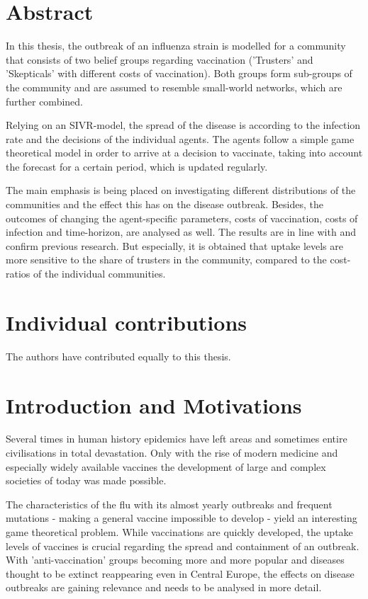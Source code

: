 \documentclass[11pt]{article}
\begin{document}
\section*{Abstract}
In this thesis, the outbreak of an influenza strain is modelled for a community that consists of two belief groups regarding vaccination ('Trusters' and 'Skepticals' with different costs of vaccination). Both groups form sub-groups of the community and are assumed to resemble small-world networks, which are further combined.

Relying on an SIVR-model, the spread of the disease is according to the infection rate and the decisions of the individual agents. The agents follow a simple game theoretical model in order to arrive at a decision to vaccinate, taking into account the forecast for a certain period, which is updated regularly. 

The main emphasis is being placed on investigating different distributions of the communities and the effect this has on the disease outbreak. Besides, the outcomes of changing the agent-specific parameters, costs of vaccination, costs of infection and time-horizon, are analysed as well. 
The results are in line with and confirm previous research. But especially, it is obtained that uptake levels are more sensitive to the share of trusters in the community, compared to the cost-ratios of the individual communities. 

\section*{Individual contributions}
The authors have contributed equally to this thesis. 
\clearpage

\tableofcontents
\clearpage


\section{Introduction and Motivations}
Several times in human history epidemics have left areas and sometimes entire civilisations in total devastation. Only with the rise of modern medicine and especially widely available vaccines the development of large and complex societies of today was made possible.

The characteristics of the flu with its almost yearly outbreaks and frequent mutations - making a general vaccine impossible to develop - yield an interesting game theoretical problem. While vaccinations are quickly developed, the uptake levels of vaccines is crucial regarding the spread and containment of an outbreak.
With 'anti-vaccination' groups becoming more and more popular and diseases thought to be extinct reappearing even in Central Europe, the effects on disease outbreaks are gaining relevance and needs to be analysed in more detail.
\end{document}
